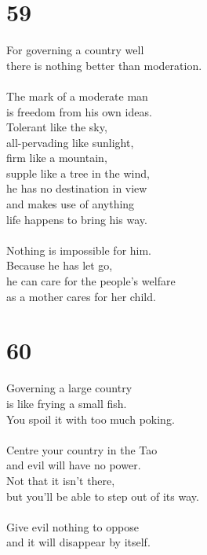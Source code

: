 \documentclass[b5paper, 12pt, oneside]{book}
\begin{document}
\chapter*{59}
For governing a country well\\
there is nothing better than moderation.\\
\\
The mark of a moderate man\\
is freedom from his own ideas.\\
Tolerant like the sky,\\
all-pervading like sunlight,\\
firm like a mountain,\\
supple like a tree in the wind,\\
he has no destination in view\\
and makes use of anything\\
life happens to bring his way.\\
\\
Nothing is impossible for him.\\
Because he has let go,\\
he can care for the people's welfare\\
as a mother cares for her child.

\chapter*{60}
Governing a large country\\
is like frying a small fish.\\
You spoil it with too much poking.\\
\\
Centre your country in the Tao\\
and evil will have no power.\\
Not that it isn't there,\\
but you'll be able to step out of its way.\\
\\
Give evil nothing to oppose\\
and it will disappear by itself.
\end{document}
